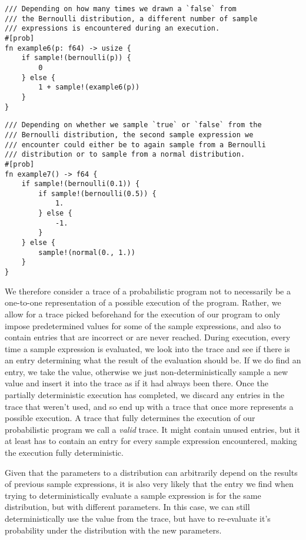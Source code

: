 \begin{minipage}{\linewidth}
\begin{lstlisting}
/// Depending on how many times we drawn a `false` from
/// the Bernoulli distribution, a different number of sample
/// expressions is encountered during an execution.
#[prob]
fn example6(p: f64) -> usize {
    if sample!(bernoulli(p)) {
        0
    } else {
        1 + sample!(example6(p))
    }
}
\end{lstlisting}
\end{minipage}


\begin{minipage}{\linewidth}
\begin{lstlisting}
/// Depending on whether we sample `true` or `false` from the
/// Bernoulli distribution, the second sample expression we
/// encounter could either be to again sample from a Bernoulli
/// distribution or to sample from a normal distribution. 
#[prob]
fn example7() -> f64 {
    if sample!(bernoulli(0.1)) {
        if sample!(bernoulli(0.5)) {
            1.
        } else {
            -1.
        }
    } else {
        sample!(normal(0., 1.))
    }
}
\end{lstlisting}
\end{minipage}

We therefore consider a trace of a probabilistic program not to necessarily be a one-to-one representation of a possible execution of the program. Rather, we allow for a trace picked beforehand for the execution of our program to only impose predetermined values for some of the sample expressions, and also to contain entries that are incorrect or are never reached. During execution, every time a sample expression is evaluated, we look into the trace and see if there is an entry determining what the result of the evaluation should be. If we do find an entry, we take the value, otherwise we just non-deterministically sample a new value and insert it into the trace as if it had always been there. Once the partially deterministic execution has completed, we discard any entries in the trace that weren't used, and so end up with a trace that once more represents a possible execution. A trace that fully determines the execution of our probabilistic program we call a \textit{valid} trace. It might contain unused entries, but it at least has to contain an entry for every sample expression encountered, making the execution fully deterministic.

Given that the parameters to a distribution can arbitrarily depend on the results of previous sample expressions, it is also very likely that the entry we find when trying to deterministically evaluate a sample expression is for the same distribution, but with different parameters. In this case, we can still deterministically use the value from the trace, but have to re-evaluate it's probability under the distribution with the new parameters.

